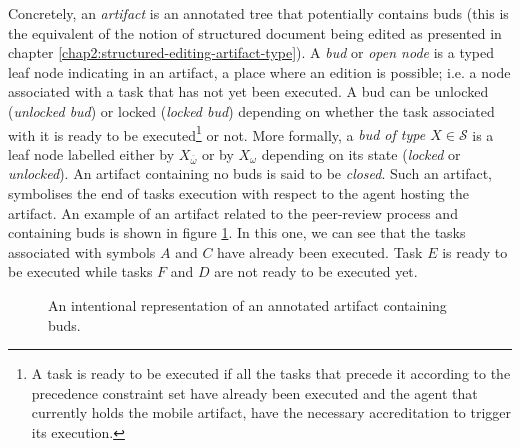 Concretely, an \textit{artifact} is an annotated tree that potentially contains buds (this is the equivalent of the notion of structured document being edited as presented in chapter \ref{chap2:structured-editing-artifact-type}). A \textit{bud} or \textit{open node} is a typed leaf node indicating in an artifact, a place where an edition is possible; i.e. a node associated with a task that has not yet been executed. A bud can be unlocked (\textit{unlocked bud}) or locked (\textit{locked bud}) depending on whether the task associated with it is ready to be executed\footnote{A task is ready to be executed if all the tasks that precede it according to the precedence constraint set have already been executed and the agent that currently holds the mobile artifact, have the necessary accreditation to trigger its execution.} or not. More formally, a \textit{bud of type $X \in \mathcal{S}$} is a leaf node labelled either by $X_{\overline{\omega}}$ or by $X_\omega$ depending on its state (\emph{locked} or \emph{unlocked}). An artifact containing no buds is said to be \textit{closed}. Such an artifact, symbolises the end of tasks execution with respect to the agent hosting the artifact. An example of an artifact related to the peer-review process and containing buds is shown in figure \ref{chap3:sec:artifact-with-buds}. In this one, we can see that the tasks associated with symbols $A$ and $C$ have already been executed. Task $E$ is ready to be executed while tasks $F$ and $D$ are not ready to be executed yet.
\begin{figure}[ht!]
	\noindent
	\caption{An intentional representation of an annotated artifact containing buds.}
	\label{chap3:sec:artifact-with-buds}
\end{figure}

